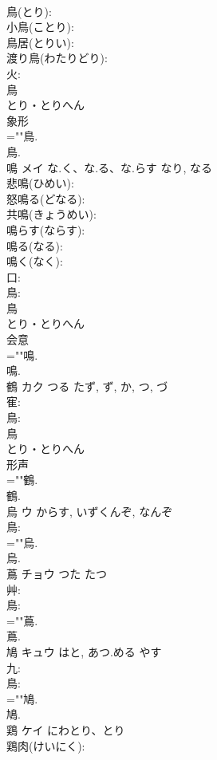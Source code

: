 \documentclass[8pt]{extreport}
\begin{document}
\begin{CJK}{UTF8}{min}
\\	鳥(とり): 
\\	小鳥(ことり): 
\\	鳥居(とりい): 
\\	渡り鳥(わたりどり): 
\\	火: 
\\	鳥	
\\	とり・とりへん	
\\	象形 
\\	=""鳥.
\\	鳥.
\\	鳴	メイ	な.く、な.る、な.らす	なり, なる	
\\	悲鳴(ひめい): 
\\	怒鳴る(どなる): 
\\	共鳴(きょうめい): 
\\	鳴らす(ならす): 
\\	鳴る(なる): 
\\	鳴く(なく): 
\\	口: 
\\	鳥: 
\\	鳥	
\\	とり・とりへん	
\\	会意 
\\	=""鳴.
\\	鳴.
\\	鶴	カク	つる	たず, ず, か, つ, づ	
\\	寉: 
\\	鳥: 
\\	鳥	
\\	とり・とりへん	
\\	形声 
\\	=""鶴.
\\	鶴.
\\	烏	ウ	からす, いずくんぞ, なんぞ		
\\	鳥: 
\\	=""烏.
\\	烏.
\\	蔦	チョウ	つた	たつ	
\\	艸: 
\\	鳥: 
\\	=""蔦.
\\	蔦.
\\	鳩	キュウ	はと, あつ.める	やす	
\\	九: 
\\	鳥: 
\\	=""鳩.
\\	鳩.
\\	鶏	ケイ	にわとり、とり		
\\	鶏肉(けいにく): 

\end{CJK}
\end{document}
